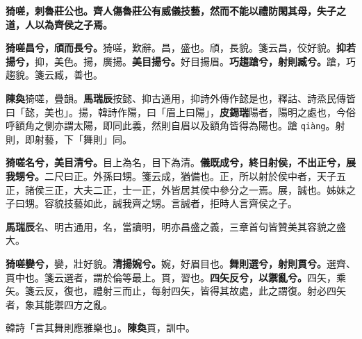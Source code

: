 
\textbf{猗嗟，刺魯莊公也。齊人傷魯莊公有威儀技藝，然而不能以禮防閑其母，失子之道，人以為齊侯之子焉。}

\textbf{猗嗟昌兮，頎而長兮。}{\footnotesize 猗嗟，歎辭。昌，盛也。頎，長貌。箋云昌，佼好貌。}\textbf{抑若揚兮，}{\footnotesize 抑，美色。揚，廣揚。}\textbf{美目揚兮。}{\footnotesize 好目揚眉。}\textbf{巧趨蹌兮，射則臧兮。}{\footnotesize 蹌，巧趨貌。箋云臧，善也。}

\begin{quoting}\textbf{陳奐}猗嗟，疊韻。\textbf{馬瑞辰}按懿、抑古通用，抑詩外傳作懿是也，釋詁、詩烝民傳皆曰「懿，美也」。揚，韓詩作陽，曰「眉上曰陽」，\textbf{皮錫瑞}陽者，陽明之處也，今俗呼額角之側亦謂太陽，即同此義，然則自眉以及額角皆得為陽也。蹌 \texttt{qiàng}。射則，即射藝，下「舞則」同。\end{quoting}

\textbf{猗嗟名兮，美目清兮。}{\footnotesize 目上為名，目下為清。}\textbf{儀既成兮，終日射侯，不出正兮，展我甥兮。}{\footnotesize 二尺曰正。外孫曰甥。箋云成，猶備也。正，所以射於侯中者，天子五正，諸侯三正，大夫二正，士一正，外皆居其侯中參分之一焉。展，誠也。姊妹之子曰甥。容貌技藝如此，誠我齊之甥。言誠者，拒時人言齊侯之子。}

\begin{quoting}\textbf{馬瑞辰}名、明古通用，名，當讀明，明亦昌盛之義，三章首句皆贊美其容貌之盛大。\end{quoting}

\textbf{猗嗟孌兮，}{\footnotesize 孌，壯好貌。}\textbf{清揚婉兮。}{\footnotesize 婉，好眉目也。}\textbf{舞則選兮，射則貫兮。}{\footnotesize 選齊、貫中也。箋云選者，謂於倫等最上。貫，習也。}\textbf{四矢反兮，以禦亂兮。}{\footnotesize 四矢，乘矢。箋云反，復也，禮射三而止，每射四矢，皆得其故處，此之謂復。射必四矢者，象其能禦四方之亂。}

\begin{quoting}韓詩「言其舞則應雅樂也」。\textbf{陳奐}貫，訓中。\end{quoting}

